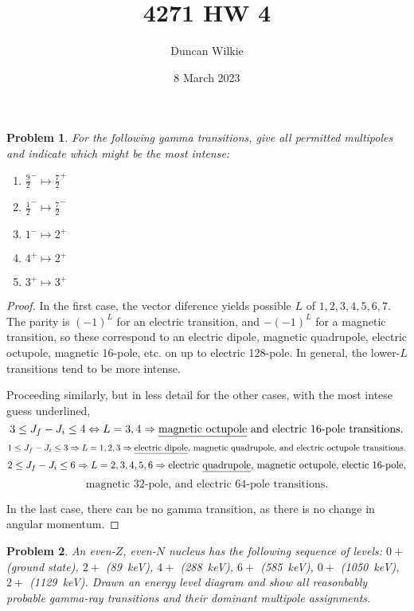 \documentclass{article}
\title{4271 HW 4}
\author{Duncan Wilkie}
\date{8 March 2023}
\newtheorem{plm}{Problem}
\begin{document}
\maketitle

\begin{plm}
  For the following gamma transitions, give all permitted multipoles and indicate which might be the most intense:
  \begin{enumerate}
  \item $\frac{9}{2}^{-} \mapsto \frac{7}{2}^{+}$
  \item $\frac{1}{2}^{-} \mapsto \frac{7}{2}^{-}$
  \item ${1}^{-} \mapsto 2^{+}$
  \item $4^{+} \mapsto 2^{+}$
  \item $3^{+} \mapsto 3^{+}$
  \end{enumerate}
\end{plm}

\begin{proof}
  In the first case, the vector diference yields possible $L$ of $1, 2, 3, 4, 5, 6, 7$.
  The parity is $(-1)^{L}$ for an electric transition, and $-(-1)^{L}$ for a magnetic transition,
  so these correspond to an electric dipole, magnetic quadrupole, electric octupole, magnetic 16-pole, etc. on up to electric 128-pole.
  In general, the lower-$L$ transitions tend to be more intense.

  Proceeding similarly, but in less detail for the other cases, with the most intese guess underlined,
  \[
    3 \leq J_{f}- J_{i} \leq 4 \Leftrightarrow L = 3, 4 \Rightarrow \textrm{\underline{magnetic octupole} and electric 16-pole transitions.}
  \]
  \[
    1 \leq J_{f} - J_{i} \leq 3 \Rightarrow L = 1, 2, 3 \Rightarrow \textrm{\underline{electric dipole}, magnetic quadrupole,
      and electric octupole transitions.}
  \]
  \[
    2 \leq J_{f} - J_{i} \leq 6 \Rightarrow L = 2, 3, 4, 5, 6 \Rightarrow \textrm{electric \underline{quadrupole}, magnetic octupole,
      electic 16-pole,}\]
  \[
    \text{magnetic 32-pole, and electric 64-pole transitions.}
  \]

  In the last case, there can be no gamma transition, as there is no change in angular momentum.
\end{proof}

\begin{plm}
  An even-$Z$, even-$N$ nucleus has the following sequence of levels: $0+$ (ground state), $2+$ (\SI{89}{keV}), $4+$ (\SI{288}{keV}),
  $6+$ (\SI{585}{keV}), $0+$ (\SI{1050}{keV}), $2+$ (\SI{1129}{keV}).
  Drawn an energy level diagram and show all reasonbably probable gamma-ray transitions and their dominant multipole assignments.
\end{plm}
\end{document}
